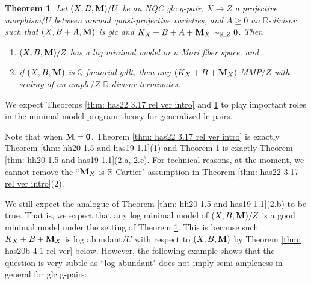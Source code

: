 \documentclass[11pt]{amsart}
\numberwithin{equation}{section}
\newcommand{\Mm}{{\bf{M}}}
\newcommand{\Qq}{\mathbb{Q}}
\newcommand{\Rr}{\mathbb{R}}
\newtheorem{thm}{Theorem}[section]
\theoremstyle{definition}
\theoremstyle{definition}
\theoremstyle{definition}
\begin{document}
\begin{thm}\label{thm: bir12 1.1 gpair}
Let $(X,B,\Mm)/U$ be an NQC glc g-pair, $X\rightarrow Z$ a projective morphism$/U$ between normal quasi-projective varieties, and $A\geq 0$ an $\Rr$-divisor such that $(X,B+A,\Mm)$ is glc and $K_X+B+A+\Mm_X\sim_{\Rr,Z}0$. Then
\begin{enumerate}
    \item $(X,B,\Mm)/Z$ has a log minimal model or a Mori fiber space, and
    \item if $(X,B,\Mm)$ is $\Qq$-factorial gdlt, then any $(K_X+B+\Mm_X)$-MMP$/Z$ with scaling of an ample$/Z$ $\Rr$-divisor terminates.
\end{enumerate}
\end{thm}

We expect Theorems \ref{thm: has22 3.17 rel ver intro} and \ref{thm: bir12 1.1 gpair} to 
play important roles in the minimal model program theory for generalized lc pairs.

Note that when $\Mm=\bf{0}$, Theorem \ref{thm: has22 3.17 rel ver intro} is exactly Theorem \ref{thm: hh20 1.5 and has19 1.1}(1) and Theorem \ref{thm: bir12 1.1 gpair} is exactly Theorem \ref{thm: hh20 1.5 and has19 1.1}(2.a, 2.c). For technical reasons, at the moment, we cannot remove the ``$\Mm_X$ is $\Rr$-Cartier" assumption in Theorem \ref{thm: has22 3.17 rel ver intro}(2).

We still expect the analogue of Theorem \ref{thm: hh20 1.5 and has19 1.1}(2.b) to be true. That is, we expect that any log minimal model of $(X,B,\Mm)/Z$ is a good minimal model under the setting of Theorem \ref{thm: bir12 1.1 gpair}. This is because such $K_X+B+\Mm_X$ is log abundant$/U$ with respect to $(X,B,\Mm)$ by Theorem \ref{thm: has20b 4.1 rel ver} below. However, the following example shows that the question is very subtle as ``log abundant" does not imply semi-ampleness in general for glc g-pairs:
\end{document}
